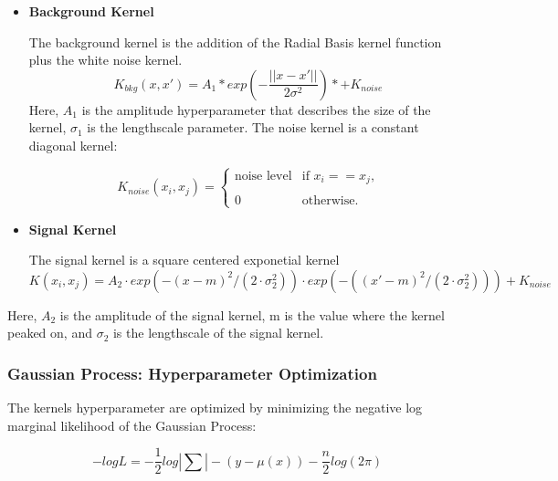     \begin{itemize}
        \item \textbf{Background Kernel}

            The background kernel is the addition of the Radial Basis kernel function plus the white noise kernel.
            \begin{equation}
                K_{bkg}(x, x') = A_{1} * exp(-\frac{||x-x'||}{2\sigma^{2}}) *+ K_{noise}
            \end{equation}
            Here, $A_{1}$ is the amplitude hyperparameter that describes the size of the kernel, $\sigma_{1}$ is the lengthscale parameter.
            The noise kernel is a constant diagonal kernel:
            

			\begin{equation}
            K_{noise}(x_{i}, x_{j}) =
			\begin{cases} \text{noise level} & \text{if $x_{i}==x_{j}$,} \\
			\\
            0 & \text{otherwise.}
			\end{cases}
			\end{equation}

        \item \textbf{Signal Kernel}

            The signal kernel is a square centered exponetial kernel
            \begin{equation}
            K(x_{i}, x_{j})=A_{2}\cdot exp(-(x-m)^{2}/(2\cdot\sigma_{2}^{2}))\cdot exp(-((x'-m)^{2}/(2\cdot\sigma_{2}^{2}))) + K_{noise}
            \end{equation}

    \end{itemize}
            Here, $A_{2}$ is the amplitude of the signal kernel, m is the value where the kernel peaked on, and $\sigma_{2}$ is the lengthscale of the signal kernel. 
    \subsubsection{Gaussian Process: Hyperparameter Optimization}
    The kernels hyperparameter are optimized by minimizing the negative log marginal likelihood of the Gaussian Process:

    \begin{equation}
        -logL = -\frac{1}{2} log |\sum| - (y-\mu(x) ) - \frac{n}{2}log(2\pi)
    \end{equation}
    

